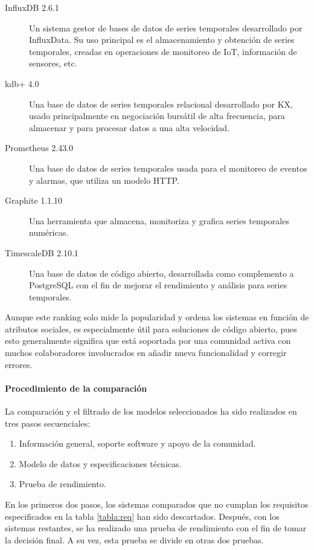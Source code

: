 \begin{description}
    \item[InfluxDB 2.6.1] Un sistema gestor de bases de datos de series temporales desarrollado por InfluxData. Su
        uso principal es el almacenamiento y obtención de series temporales, creadas en operaciones de monitoreo de IoT,
        información de sensores, etc.
    \item[kdb+ 4.0] Una base de datos de series temporales relacional desarrollado por KX, usado principalmente en
        negociación bursátil de alta frecuencia, para almacenar y para procesar datos a una alta velocidad.
    \item[Prometheus 2.43.0] Una base de datos de series temporales usada para el monitoreo de eventos y alarmas, que
        utiliza un modelo HTTP.
    \item[Graphite 1.1.10] Una herramienta que almacena, monitoriza y grafica series temporales numéricas.   
    \item[TimescaleDB 2.10.1] Una base de datos de código abierto, desarrollada como complemento a PostgreSQL con el
        fin de mejorar el rendimiento y análisis para series temporales.
\end{description}

Aunque este ranking solo mide la popularidad y ordena los sistemas en función de atributos sociales, es especialmente
útil para soluciones de código abierto, pues esto generalmente significa que está soportada por una comunidad activa
con muchos colaboradores involucrados en añadir nueva funcionalidad y corregir errores.

\paragraph*{Procedimiento de la comparación}
La comparación y el filtrado de los modelos seleccionados ha sido realizados en tres pasos secuenciales:
\begin{enumerate}
    \item Información general, soporte software y apoyo de la comunidad.
    \item Modelo de datos y especificaciones técnicas.
    \item Prueba de rendimiento.
\end{enumerate}

En los primeros dos pasos, los sistemas comparados que no cumplan los requisitos especificados en la tabla \ref{tabla:req}
han sido descartados. Después, con los sistemas restantes, se ha realizado una prueba de rendimiento con el fin de
tomar la decisión final. A su vez, esta prueba se divide en otras dos pruebas.

